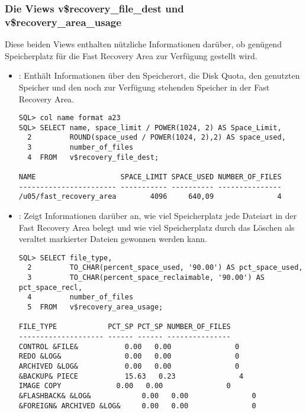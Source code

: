         \subsubsection{Die Views v\$recovery\_file\_dest und v\$recovery\_area\_usage}
          Diese beiden Views enthalten n\"utzliche Informationen dar\"uber, ob gen\"ugend Speicherplatz f\"ur die Fast Recovery Area zur Verf\"ugung gestellt wird.
          \begin{itemize}
            \item {}: Enth\"alt Informationen
            \"uber den Speicherort, die Disk Quota, den genutzten Speicher und
            den noch zur Verf\"ugung stehenden Speicher in der Fast Recovery
            Area.
            \begin{lstlisting}[caption={\identifier{v\$recovery\_file\_dest}},label=admin1035,language=oracle_sql]
SQL> col name format a23
SQL> SELECT name, space_limit / POWER(1024, 2) AS Space_Limit,
  2         ROUND(space_used / POWER(1024, 2),2) AS space_used, 
  3         number_of_files
  4  FROM   v$recovery_file_dest;

NAME                    SPACE_LIMIT SPACE_USED NUMBER_OF_FILES
----------------------- ----------- ---------- ---------------
/u05/fast_recovery_area        4096     640,09               4

            \end{lstlisting}

           \item {}: Zeigt Informationen dar\"uber an, wie viel Speicherplatz jede Dateiart in der Fast Recovery Area belegt und wie viel Speicherplatz durch das L\"oschen als veraltet markierter Dateien gewonnen werden kann.
            \begin{lstlisting}[caption={\identifier{v\$recovery\_area\_usage}},label=admin1036,language=oracle_sql]
SQL> SELECT file_type,
  2         TO_CHAR(percent_space_used, '90.00') AS pct_space_used,
  3         TO_CHAR(percent_space_reclaimable, '90.00') AS pct_space_recl,
  4         number_of_files
  5  FROM   v$recovery_area_usage;
  
FILE_TYPE            PCT_SP PCT_SP NUMBER_OF_FILES
-------------------- ------ ------ ---------------
CONTROL &FILE&           0.00   0.00               0
REDO &LOG&               0.00   0.00               0
ARCHIVED &LOG&           0.00   0.00               0
&BACKUP& PIECE           15.63   0.23               4
IMAGE COPY             0.00   0.00               0
&FLASHBACK& &LOG&            0.00   0.00               0
&FOREIGN& ARCHIVED &LOG&     0.00   0.00               0
            \end{lstlisting}
          \end{itemize}

